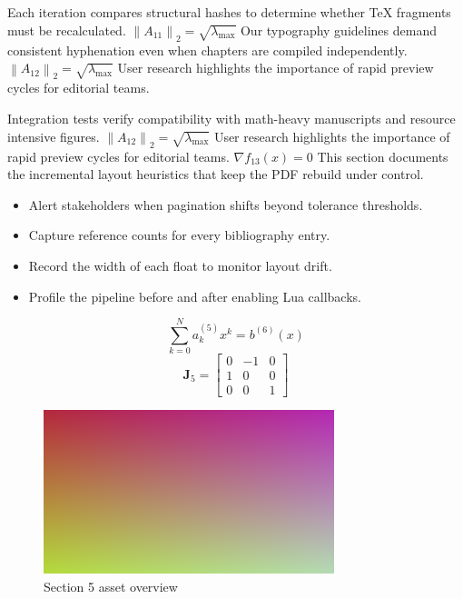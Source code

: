     Each iteration compares structural hashes to determine whether TeX fragments must be recalculated.  $\left\|A_{11}\right\|_{2} = \sqrt{\lambda_{\max}}$  Our typography guidelines demand consistent hyphenation even when chapters are compiled independently.  $\left\|A_{12}\right\|_{2} = \sqrt{\lambda_{\max}}$  User research highlights the importance of rapid preview cycles for editorial teams.
    \par
  
    Integration tests verify compatibility with math-heavy manuscripts and resource intensive figures.  $\left\|A_{12}\right\|_{2} = \sqrt{\lambda_{\max}}$  User research highlights the importance of rapid preview cycles for editorial teams.  $\nabla f_{13}(x) = 0$  This section documents the incremental layout heuristics that keep the PDF rebuild under control.
    \par
  
    \begin{itemize}
      
    \item Alert stakeholders when pagination shifts beyond tolerance thresholds.
    \item Capture reference counts for every bibliography entry.
    \item Record the width of each float to monitor layout drift.
    \item Profile the pipeline before and after enabling Lua callbacks.
    \end{itemize}
\begin{equation}
\label{eq:sec5-eq1}
\sum_{k=0}^{N} a_k^{(5)} x^k = b^{(6)}(x)
\end{equation}
\[
\mathbf{J}_{5} = \begin{bmatrix} 0 & -1 & 0 \\ 1 & 0 & 0 \\ 0 & 0 & 1 \end{bmatrix}
\]

    \begin{figure}[htbp]
      \centering
      
          \includegraphics[width=0.82\linewidth]{../assets/images/placeholder2.png}
        
        \caption{Section 5 asset overview}
      
        \label{fig:fig-sec5}
      
    \end{figure}
  
